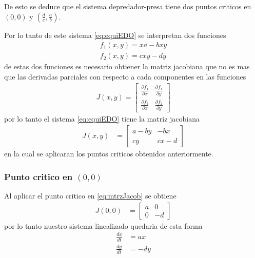 \documentclass{report}
\begin{document}
De esto se deduce que el sistema depredador-presa tiene dos puntos criticos en $(0,0)$ y  $(\frac{d}{c},\frac{a}{b})$.

Por lo tanto de este sistema \ref{eq:equiEDO} se interpretan dos funciones
\begin{align*}
f_1(x,y) = xa-bxy \\
f_2(x,y)= cxy-dy 
\end{align*}
de estas dos funciones es necesario obtiener la matriz jacobiana
que no es mas que las derivadas parciales con respecto a cada componentes en las funciones
\begin{align*}
J(x,y)=
\begin{bmatrix}
\frac{\partial f_1}{\partial x }& \frac{\partial f_1}{\partial y }\\
\frac{\partial f_2}{\partial x} &\frac{\partial f_2}{\partial y}
\end{bmatrix}
\end{align*} 
por lo tanto el sistema \ref{eq:equiEDO} tiene la matriz jacobiana
\begin{align}
J(x,y)&=
\left[
\begin{matrix}
a-by &-bx\\
cy &cx-d
\end{matrix}\right] \label{eq:mtrzJacob}
\end{align}
en la cual se aplicaran los puntos criticos obtenidos anteriormente.

\subsubsection{Punto critico en $(0,0)$}
Al aplicar el punto critico en \ref{eq:mtrzJacob} se obtiene
\begin{align}
J(0,0)&=
\left[
\begin{matrix}
a &0\\
0 &-d
\end{matrix}\right]
\end{align}
por lo tanto nuestro sistema linealizado quedaria de esta forma
\begin{align}
\frac{dx}{dt}&= ax \nonumber\\
\frac{dy}{dt}&= -dy \label{eq:sisPC1}
\end{align}

\end{document}

